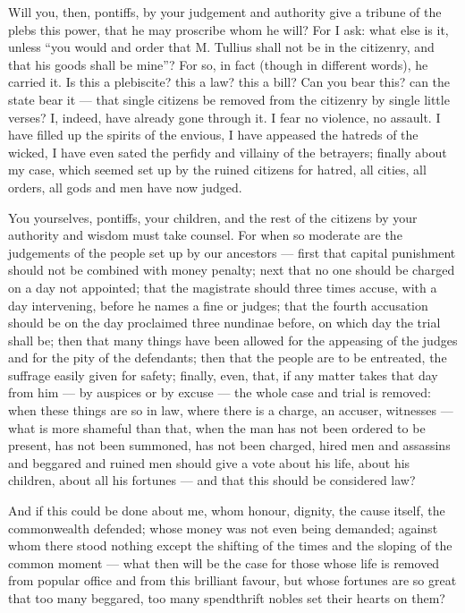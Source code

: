  Will you, then, pontiffs, by your judgement and authority give a tribune of the plebs this power, that he may proscribe whom he will? For I ask: what else is it, unless ``you would and order that M. Tullius shall not be in the citizenry, and that his goods shall be mine''? For so, in fact (though in different words), he carried it. Is this a plebiscite? this a law? this a bill? Can you bear this? can the state bear it --- that single citizens be removed from the citizenry by single little verses? I, indeed, have already gone through it. I fear no violence, no assault. I have filled up the spirits of the envious, I have appeased the hatreds of the wicked, I have even sated the perfidy and villainy of the betrayers; finally about my case, which seemed set up by the ruined citizens for hatred, all cities, all orders, all gods and men have now judged.

 You yourselves, pontiffs, your children, and the rest of the citizens by your authority and wisdom must take counsel. For when so moderate are the judgements of the people set up by our ancestors --- first that capital punishment should not be combined with money penalty; next that no one should be charged on a day not appointed; that the magistrate should three times accuse, with a day intervening, before he names a fine or judges; that the fourth accusation should be on the day proclaimed three nundinae before, on which day the trial shall be; then that many things have been allowed for the appeasing of the judges and for the pity of the defendants; then that the people are to be entreated, the suffrage easily given for safety; finally, even, that, if any matter takes that day from him --- by auspices or by excuse --- the whole case and trial is removed: when these things are so in law, where there is a charge, an accuser, witnesses --- what is more shameful than that, when the man has not been ordered to be present, has not been summoned, has not been charged, hired men and assassins and beggared and ruined men should give a vote about his life, about his children, about all his fortunes --- and that this should be considered law?

 And if this could be done about me, whom honour, dignity, the cause itself, the commonwealth defended; whose money was not even being demanded; against whom there stood nothing except the shifting of the times and the sloping of the common moment --- what then will be the case for those whose life is removed from popular office and from this brilliant favour, but whose fortunes are so great that too many beggared, too many spendthrift nobles set their hearts on them?

